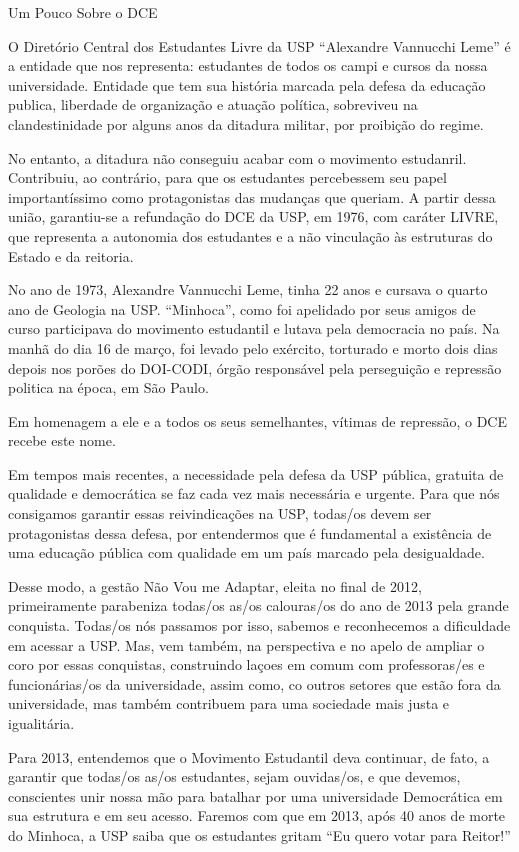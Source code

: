 \begin{secao}{Um Pouco Sobre o DCE}

O Diretório Central dos Estudantes Livre da USP “Alexandre Vannucchi Leme” é a
entidade que nos representa: estudantes de todos os campi e cursos da nossa universidade.
Entidade que tem sua história marcada pela defesa da educação publica, liberdade
de organização e atuação política, sobreviveu na clandestinidade por alguns anos
da ditadura militar, por proibição do regime.

No entanto, a ditadura não conseguiu acabar com o movimento estudanril. Contribuiu,
ao contrário, para que os estudantes percebessem seu papel importantíssimo como
protagonistas das mudanças que queriam. A partir dessa união, garantiu-se a
refundação do DCE da USP, em 1976, com caráter LIVRE, que representa a autonomia
dos estudantes e a não vinculação às estruturas do Estado e da reitoria.

No ano de 1973, Alexandre Vannucchi Leme, tinha 22 anos e cursava o quarto ano
de Geologia na USP. “Minhoca”, como foi apelidado por seus amigos de curso participava
do movimento estudantil e lutava pela democracia no país. Na manhã do dia 16 de março,
foi levado pelo exército, torturado e morto dois dias depois nos porões do DOI-CODI,
órgão responsável pela perseguição e repressão politica na época, em São Paulo.

Em homenagem a ele e a todos os seus semelhantes, vítimas de repressão, o DCE recebe este nome.

Em tempos mais recentes, a necessidade pela defesa da USP pública, gratuita de qualidade
e democrática se faz cada vez mais necessária e urgente. Para que nós consigamos
garantir essas reivindicações na USP, todas/os devem ser protagonistas dessa defesa,
por entendermos que é fundamental a existência de uma educação pública com qualidade
em um país marcado pela desigualdade.

Desse modo, a gestão Não Vou me Adaptar, eleita no final de 2012, primeiramente
parabeniza todas/os as/os calouras/os do ano de 2013 pela grande conquista.
Todas/os nós passamos por isso, sabemos e reconhecemos a dificuldade em acessar a USP.
Mas, vem também, na perspectiva e no apelo de ampliar o coro por essas conquistas,
construindo laçoes em comum com professoras/es e funcionárias/os da universidade,
assim como, co outros setores que estão fora da universidade, mas também contribuem
para uma sociedade mais justa e igualitária.

Para 2013, entendemos que o Movimento Estudantil deva continuar, de fato, a garantir
que todas/os as/os estudantes, sejam ouvidas/os, e que devemos, conscientes unir nossa
mão para batalhar por uma universidade Democrática em sua estrutura e em seu acesso.
Faremos com que em 2013, após 40 anos de morte do Minhoca, a USP saiba que os estudantes
gritam “Eu quero votar para Reitor!”

\end{secao}
